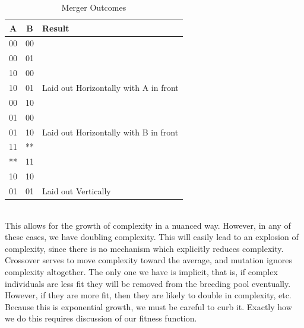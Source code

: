 \begin{table}
	\centering
\begin{tabular}{|c c | l|}
	\hline
	A & B & Result\\
	\hline
	00 & 00 & \\
	00 & 01 &\\
	10 & 00 &\\
	10 & 01 &Laid out Horizontally with A in front\\
	\hline
	00 & 10&\\
	01 & 00&\\
	01 & 10& Laid out Horizontally with B in front\\
	\hline
	11 & ** & \\
	** & 11 & \\
	10 & 10 & \\
	01 & 01 & Laid out Vertically\\
	\hline	
\end{tabular}
\caption{Merger Outcomes} \label{tab:merger}
\end{table}	\\
This allows for the growth of complexity in a nuanced way.  However, in any of these cases, we have doubling complexity.  This will easily lead to an explosion of complexity, since there is no mechanism which explicitly reduces complexity.    Crossover serves to move complexity toward the average, and mutation ignores complexity altogether.  The only one we have is implicit, that is, if complex individuals are less fit they will be removed from the breeding pool eventually.  However, if they are more fit, then they are likely to double in complexity, etc.  Because this is exponential growth, we must be careful to curb it.  Exactly how we do this requires discussion of our fitness function.\\

